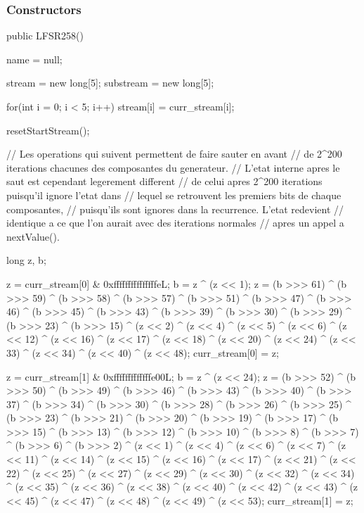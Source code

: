 \subsubsection* {Constructors}

\begin{code}
    public LFSR258() \begin{hide} {
        name = null;

        stream = new long[5];
        substream = new long[5];

        for(int i = 0; i < 5; i++)
            stream[i] = curr_stream[i];

        resetStartStream();



        // Les operations qui suivent permettent de faire sauter en avant
        // de 2^200 iterations chacunes des composantes du generateur.
        // L'etat interne apres le saut est cependant legerement different
        // de celui apres 2^200 iterations puisqu'il ignore l'etat dans
        // lequel se retrouvent les premiers bits de chaque composantes,
        // puisqu'ils sont ignores dans la recurrence. L'etat redevient
        // identique a ce que l'on aurait avec des iterations normales
        // apres un appel a nextValue().

        long z, b;

        z = curr_stream[0] & 0xfffffffffffffffeL;
        b = z ^ (z << 1);
        z = (b >>> 61) ^ (b >>> 59) ^ (b >>> 58) ^ (b >>> 57) ^ (b >>> 51) ^
            (b >>> 47) ^ (b >>> 46) ^ (b >>> 45) ^ (b >>> 43) ^ (b >>> 39) ^
            (b >>> 30) ^ (b >>> 29) ^ (b >>> 23) ^ (b >>> 15) ^ (z << 2) ^
            (z << 4) ^ (z << 5) ^ (z << 6) ^ (z << 12) ^ (z << 16) ^
            (z << 17) ^ (z << 18) ^ (z << 20) ^ (z << 24) ^ (z << 33) ^
            (z << 34) ^ (z << 40) ^ (z << 48);
        curr_stream[0] = z;


        z = curr_stream[1] & 0xfffffffffffffe00L;
        b = z ^ (z << 24);
        z = (b >>> 52) ^ (b >>> 50) ^ (b >>> 49) ^ (b >>> 46) ^ (b >>> 43) ^
            (b >>> 40) ^ (b >>> 37) ^ (b >>> 34) ^ (b >>> 30) ^ (b >>> 28) ^
            (b >>> 26) ^ (b >>> 25) ^ (b >>> 23) ^ (b >>> 21) ^ (b >>> 20) ^
            (b >>> 19) ^ (b >>> 17) ^ (b >>> 15) ^ (b >>> 13) ^ (b >>> 12) ^
            (b >>> 10) ^ (b >>> 8) ^ (b >>> 7) ^ (b >>> 6) ^ (b >>> 2) ^
            (z << 1) ^ (z << 4) ^ (z << 6) ^ (z << 7) ^ (z << 11) ^ (z << 14) ^
            (z << 15) ^ (z << 16) ^ (z << 17) ^ (z << 21) ^ (z << 22) ^
            (z << 25) ^ (z << 27) ^ (z << 29) ^ (z << 30) ^ (z << 32) ^
            (z << 34) ^ (z << 35) ^ (z << 36) ^ (z << 38) ^ (z << 40) ^
            (z << 42) ^ (z << 43) ^ (z << 45) ^ (z << 47) ^ (z << 48) ^
            (z << 49) ^ (z << 53);
        curr_stream[1] = z;


}
\end{hide}
\end{code}
